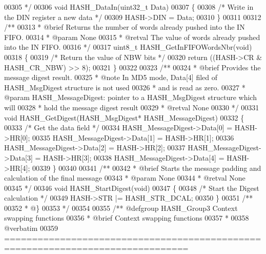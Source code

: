 \begin{DoxyCode}
00305 \textcolor{comment}{  */}
00306 \textcolor{keywordtype}{void} HASH_DataIn(uint32\_t Data)
00307 \{
00308   \textcolor{comment}{/* Write in the DIN register a new data */}
00309   HASH->DIN = Data;
00310 \}
00311 
00312 \textcolor{comment}{/**}
00313 \textcolor{comment}{  * @brief  Returns the number of words already pushed into the IN FIFO.}
00314 \textcolor{comment}{  * @param  None}
00315 \textcolor{comment}{  * @retval The value of words already pushed into the IN FIFO.}
00316 \textcolor{comment}{  */}
00317 uint8\_t HASH_GetInFIFOWordsNbr(\textcolor{keywordtype}{void})
00318 \{
00319   \textcolor{comment}{/* Return the value of NBW bits */}
00320   \textcolor{keywordflow}{return} ((HASH->CR & HASH_CR_NBW) >> 8);
00321 \}
00322 
00323 \textcolor{comment}{/**}
00324 \textcolor{comment}{  * @brief  Provides the message digest result.}
00325 \textcolor{comment}{  * @note   In MD5 mode, Data[4] filed of HASH\_MsgDigest structure is not used}
00326 \textcolor{comment}{  *         and is read as zero.  }
00327 \textcolor{comment}{  * @param  HASH\_MessageDigest: pointer to a HASH\_MsgDigest structure which will }
00328 \textcolor{comment}{  *         hold the message digest result }
00329 \textcolor{comment}{  * @retval None}
00330 \textcolor{comment}{  */}
00331 \textcolor{keywordtype}{void} HASH_GetDigest(HASH\_MsgDigest* HASH\_MessageDigest)
00332 \{
00333   \textcolor{comment}{/* Get the data field */}
00334   HASH\_MessageDigest->Data[0] = HASH->HR[0];
00335   HASH\_MessageDigest->Data[1] = HASH->HR[1];
00336   HASH\_MessageDigest->Data[2] = HASH->HR[2];
00337   HASH\_MessageDigest->Data[3] = HASH->HR[3];
00338   HASH\_MessageDigest->Data[4] = HASH->HR[4];
00339 \}
00340 
00341 \textcolor{comment}{/**}
00342 \textcolor{comment}{  * @brief  Starts the message padding and calculation of the final message     }
00343 \textcolor{comment}{  * @param  None}
00344 \textcolor{comment}{  * @retval None}
00345 \textcolor{comment}{  */}
00346 \textcolor{keywordtype}{void} HASH_StartDigest(\textcolor{keywordtype}{void})
00347 \{
00348   \textcolor{comment}{/* Start the Digest calculation */}
00349   HASH->STR |= HASH_STR_DCAL;
00350 \}
00351 \textcolor{comment}{/**}
00352 \textcolor{comment}{  * @\}}
00353 \textcolor{comment}{  */}
00354 
00355 \textcolor{comment}{/** @defgroup HASH\_Group3 Context swapping functions}
00356 \textcolor{comment}{ *  @brief   Context swapping functions}
00357 \textcolor{comment}{ *}
00358 \textcolor{comment}{@verbatim   }
00359 \textcolor{comment}{ ===============================================================================}

\end{DoxyCode}
